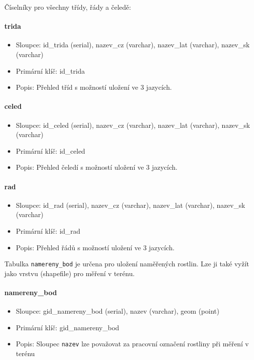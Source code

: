 \documentclass[12pt]{article}%
\begin{document}
{{%
\obrazek
{}

Číselníky pro všechny třídy, řády a čeledě:
\paragraph{trida}
\begin{itemize}
\item Sloupce: id\_trida (serial), nazev\_cz (varchar), nazev\_lat (varchar), nazev\_sk (varchar)
\item Primární klíč: id\_trida
\item Popis: Přehled tříd s možností uložení ve 3 jazycích.
\end{itemize}

\newpage
\paragraph{celed}
\begin{itemize}
\item Sloupce: id\_celed (serial), nazev\_cz (varchar), nazev\_lat (varchar), nazev\_sk (varchar)
\item Primární klíč: id\_celed
\item Popis: Přehled čeledí s možností uložení ve 3 jazycích.
\end{itemize}

\paragraph{rad}
\begin{itemize}
\item Sloupce: id\_rad (serial), nazev\_cz (varchar), nazev\_lat (varchar), nazev\_sk (varchar) 
\item Primární klíč: id\_rad
\item Popis: Přehled řádů s možností uložení ve 3 jazycích.
\end{itemize}

\newpage
Tabulka \texttt{namereny\_bod} je určena pro uložení naměřených rostlin. Lze ji také vyžít jako vrstvu 
(shapefile) pro měření v terénu.
\paragraph{namereny\_bod}
\begin{itemize}
\item Sloupce: gid\_namereny\_bod (serial), nazev (varchar), geom (point)
\item Primární klíč: gid\_namereny\_bod
\item Popis: Sloupec \texttt{nazev} lze považovat za pracovní označení rostliny při měření v terénu
\end{itemize}

}}
\end{document}

